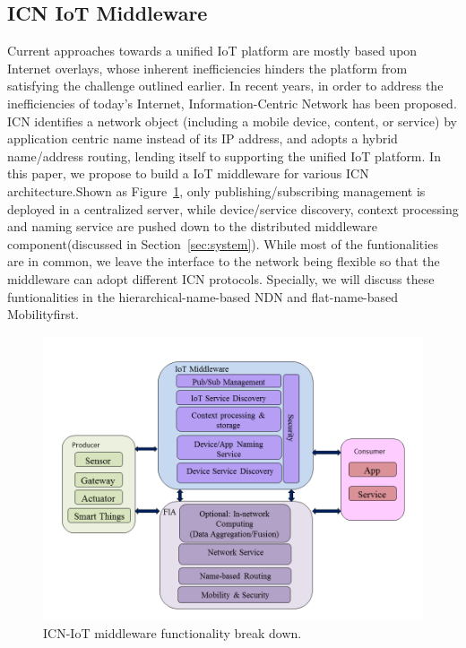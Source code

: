 \subsection{ICN IoT Middleware}
Current approaches towards a unified IoT platform are mostly based upon Internet overlays, whose inherent inefficiencies hinders the platform from satisfying the challenge outlined earlier. In recent years, in order to address  the inefficiencies of today's Internet, Information-Centric Network has been proposed. ICN identifies a network object (including a mobile device, content, or service) by application centric name instead of its IP address, and adopts a hybrid name/address routing, lending itself to supporting the unified IoT platform. In this paper, we propose to build a IoT middleware for various ICN architecture.Shown as Figure~\ref{fig:mid_arch}, only publishing/subscribing management is deployed in a centralized server, while device/service discovery, context processing and naming service are pushed down to the distributed middleware component(discussed in Section~\ref{sec:system}). While most of the funtionalities are in common, we leave the interface to the network being flexible so that the middleware can adopt different ICN protocols. Specially, we will discuss these funtionalities in the hierarchical-name-based NDN and flat-name-based Mobilityfirst. 
\begin{figure}
\centering
\includegraphics[width=\columnwidth]{figure/middleware_architecture.png}
\caption{\label{fig:mid_arch} ICN-IoT middleware functionality break down.}
\end{figure}
